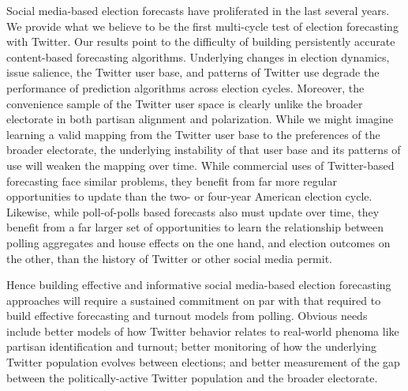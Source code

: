 \documentclass{acm_proc_article-sp}
\begin{document}
Social media-based election forecasts have proliferated in the last
several years. We provide what we believe to be the first multi-cycle
test of election forecasting with Twitter. Our results point to the
difficulty of building persistently accurate content-based forecasting
algorithms. Underlying changes in election dynamics, issue salience,
the Twitter user base, and patterns of Twitter use degrade the
performance of prediction algorithms across election cycles. Moreover,
the convenience sample of the Twitter user space is clearly unlike the
broader electorate in both partisan alignment and polarization. While
we might imagine learning a valid mapping from the Twitter user base
to the preferences of the broader electorate, the underlying
instability of that user base and its patterns of use will weaken the
mapping over time. While commercial uses of Twitter-based forecasting
face similar problems, they benefit from far more regular
opportunities to update than the two- or four-year American election
cycle. Likewise, while poll-of-polls based forecasts also must update
over time, they benefit from a far larger set of opportunities to
learn the relationship between polling aggregates and house effects on
the one hand, and election outcomes on the other, than
the history of Twitter or other social media permit.

Hence building effective and informative social media-based election
forecasting approaches will require a sustained commitment on par with
that required to build effective forecasting and turnout models from
polling. Obvious needs include better models of how Twitter behavior
relates to real-world phenoma like partisan identification and
turnout; better monitoring of how the underlying Twitter population
evolves between elections; and better measurement of the gap between
the politically-active Twitter population and the broader
electorate. 






\end{document}
